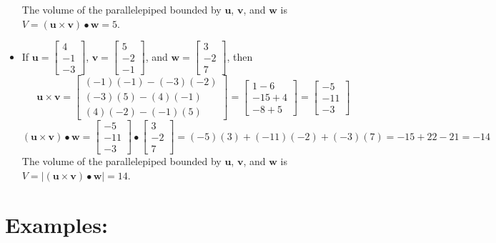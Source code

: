 \documentclass{article}
\begin{document}
\begin{itemize}
The volume of the parallelepiped bounded by \(\mathbf{u}\), \(\mathbf{v}\), and \(\mathbf{w}\) is \(V = (\mathbf{u} \times \mathbf{v}) \bullet \mathbf{w} = 5\).
\item If \(\mathbf{u} = \begin{bmatrix} 4 \\ -1 \\ -3 \end{bmatrix}\), \(\mathbf{v} = \begin{bmatrix} 5 \\ -2 \\ -1 \end{bmatrix}\), and \(\mathbf{w} = \begin{bmatrix} 3 \\ -2 \\ 7 \end{bmatrix}\), then
\[\mathbf{u} \times \mathbf{v} = \begin{bmatrix} (-1)(-1) - (-3)(-2) \\ (-3)(5) - (4)(-1) \\ (4)(-2) - (-1)(5) \end{bmatrix} = \begin{bmatrix} 1 - 6 \\ -15 + 4 \\ -8 + 5 \end{bmatrix} = \begin{bmatrix} -5 \\ -11 \\ -3 \end{bmatrix}\]
\[(\mathbf{u} \times \mathbf{v}) \bullet \mathbf{w} = \begin{bmatrix} -5 \\ -11 \\ -3 \end{bmatrix} \bullet \begin{bmatrix} 3 \\ -2 \\7 \end{bmatrix} = (-5)(3) + (-11)(-2) + (-3)(7) = -15 + 22 - 21 = -14\]
The volume of the parallelepiped bounded by \(\mathbf{u}\), \(\mathbf{v}\), and \(\mathbf{w}\) is \(V = |(\mathbf{u} \times \mathbf{v}) \bullet \mathbf{w}| = 14\).
\end{itemize}




\section*{Examples:}
\end{document}
